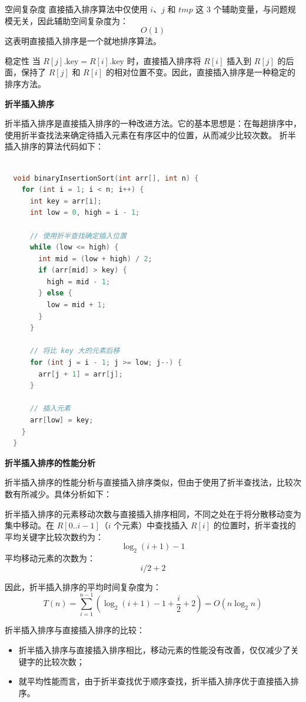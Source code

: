 \documentclass[lang=cn,newtx,10pt,scheme=chinese]{../elegantbook}
\begin{document}
空间复杂度  
直接插入排序算法中仅使用 $i$、$j$ 和 $tmp$ 这 3 个辅助变量，与问题规模无关，因此辅助空间复杂度为：
\[
O(1)
\]
这表明直接插入排序是一个就地排序算法。

稳定性  
当 $R[j].\text{key} = R[i].\text{key}$ 时，直接插入排序将 $R[i]$ 插入到 $R[j]$ 的后面，保持了 $R[j]$ 和 $R[i]$ 的相对位置不变。因此，直接插入排序是一种稳定的排序方法。

\textbf{折半插入排序}

折半插入排序是直接插入排序的一种改进方法。它的基本思想是：在每趟排序中，使用折半查找法来确定待插入元素在有序区中的位置，从而减少比较次数。
折半插入排序的算法代码如下：
\begin{lstlisting}[language=C++, caption=折半插入排序的算法代码]

  void binaryInsertionSort(int arr[], int n) {
    for (int i = 1; i < n; i++) {
      int key = arr[i];
      int low = 0, high = i - 1;

      // 使用折半查找确定插入位置
      while (low <= high) {
        int mid = (low + high) / 2;
        if (arr[mid] > key) {
          high = mid - 1;
        } else {
          low = mid + 1;
        }
      }

      // 将比 key 大的元素后移
      for (int j = i - 1; j >= low; j--) {
        arr[j + 1] = arr[j];
      }

      // 插入元素
      arr[low] = key;
    }
  }

  \end{lstlisting}

\textbf{折半插入排序的性能分析}

折半插入排序的性能分析与直接插入排序类似，但由于使用了折半查找法，比较次数有所减少。具体分析如下：


折半插入排序的元素移动次数与直接插入排序相同，不同之处在于将分散移动变为集中移动。在 $R[0..i-1]$（$i$ 个元素）中查找插入 $R[i]$ 的位置时，折半查找的平均关键字比较次数约为：
\[
\log_2(i+1) - 1
\]
平均移动元素的次数为：
\[
i/2 + 2
\]

因此，折半插入排序的平均时间复杂度为：
\[
T(n) = \sum_{i=1}^{n-1} \left(\log_2(i+1) - 1 + \frac{i}{2} + 2\right) = O(n \log_2 n)
\]


折半插入排序与直接插入排序的比较：
\begin{itemize}
  \item 折半插入排序与直接插入排序相比，移动元素的性能没有改善，仅仅减少了关键字的比较次数；
  \item 就平均性能而言，由于折半查找优于顺序查找，折半插入排序优于直接插入排序。
\end{itemize}
\end{document}
